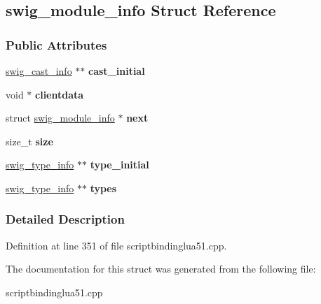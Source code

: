 \hypertarget{structswig__module__info}{
\subsection{swig\_\-module\_\-info Struct Reference}
\label{structswig__module__info}
}
\subsubsection*{Public Attributes}
\begin{DoxyCompactItemize}
\item 
\hypertarget{structswig__module__info_a15f6b50a41f144afb1148fc412dc01f7}{
\hyperlink{structswig__cast__info}{swig\_\-cast\_\-info} $\ast$$\ast$ {\bfseries cast\_\-initial}}
\label{structswig__module__info_a15f6b50a41f144afb1148fc412dc01f7}

\item 
\hypertarget{structswig__module__info_a9fb6e461fcaf14c209049adfae4e9754}{
void $\ast$ {\bfseries clientdata}}
\label{structswig__module__info_a9fb6e461fcaf14c209049adfae4e9754}

\item 
\hypertarget{structswig__module__info_ac177d150b85ab77122089acf1f06d9c6}{
struct \hyperlink{structswig__module__info}{swig\_\-module\_\-info} $\ast$ {\bfseries next}}
\label{structswig__module__info_ac177d150b85ab77122089acf1f06d9c6}

\item 
\hypertarget{structswig__module__info_aaf8907cf8509ee0464af8c9dfd909042}{
size\_\-t {\bfseries size}}
\label{structswig__module__info_aaf8907cf8509ee0464af8c9dfd909042}

\item 
\hypertarget{structswig__module__info_a76c7d5b0fc10371748616d0b6c815a17}{
\hyperlink{structswig__type__info}{swig\_\-type\_\-info} $\ast$$\ast$ {\bfseries type\_\-initial}}
\label{structswig__module__info_a76c7d5b0fc10371748616d0b6c815a17}

\item 
\hypertarget{structswig__module__info_ad658c7738e9a035ef8eea865322fbf13}{
\hyperlink{structswig__type__info}{swig\_\-type\_\-info} $\ast$$\ast$ {\bfseries types}}
\label{structswig__module__info_ad658c7738e9a035ef8eea865322fbf13}

\end{DoxyCompactItemize}


\subsubsection{Detailed Description}


Definition at line 351 of file scriptbindinglua51.cpp.



The documentation for this struct was generated from the following file:\begin{DoxyCompactItemize}
\item 
scriptbindinglua51.cpp\end{DoxyCompactItemize}
